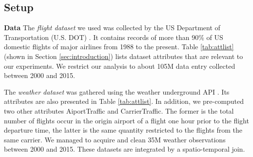 \vspace{-.2cm}

\subsection{Setup}
\label{sec:setup}


{\bf Data} The {\em flight dataset} we used was collected by the US
Department of Transportation (U.S. DOT) \cite{flightdata}. It contains
records of more than 90\% of US domestic flights of major airlines
from 1988 to the present. Table \ref{tab:attlist}(shown in Section
\ref{sec:introduction}) lists dataset attributes that are relevant to
our experiments.  We restrict our analysis to about 105M data entry
collected between 2000 and 2015.

The {\em weather dataset} was gathered using the weather underground
API \cite{Weatherdata}.  Its attributes are also presented in Table
\ref{tab:attlist}. In addition, we pre-computed two other attributes
AiportTraffic and CarrierTraffic. The former is the total number of
flights occur in the origin airport of a flight one hour prior to the
flight departure time, the latter is the same quantity restricted to
the flights from the same carrier.  We managed to acquire and clean
35M weather observations between 2000 and 2015. These datasets are
integrated by a spatio-temporal join.









